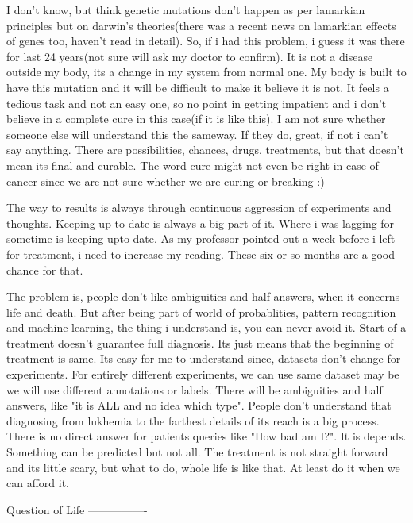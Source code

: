I don't know, but think genetic mutations don't happen as per lamarkian principles but on darwin's theories(there was a recent news on lamarkian effects of genes too, haven't read in detail). So, if i had this problem, i guess it was there for last 24 years(not sure will ask my doctor to confirm). It is not a disease outside my body, its a change in my system from normal one. My body is built to have this mutation and it will be difficult to make it believe it is not. It feels a tedious task and not an easy one, so no point in getting impatient and i don't believe in a complete cure in this case(if it is like this). I am not sure whether someone else will understand this the sameway. If they do, great, if not i can't say anything. There are possibilities, chances, drugs, treatments, but that doesn't mean its final and curable. The word cure might not even be right in case of cancer since we are not sure whether we are curing or breaking :)

The way to results is always through continuous aggression of experiments and thoughts. Keeping up to date is always a big part of it. Where i was lagging for sometime is keeping upto date. As my professor pointed out a week before i left for treatment, i need to increase my reading. These six or so months are a good chance for that. 

The problem is, people don't like ambiguities and half answers, when it concerns life and death. But after being part of world of probablities, pattern recognition and machine learning, the thing i understand is, you can never avoid it. Start of a treatment doesn't guarantee full diagnosis. Its just means that the beginning of treatment is same. Its easy for me to understand since, datasets don't change for experiments. For entirely different experiments, we can use same dataset may be we will use different annotations or labels. There will be ambiguities and half answers, like "it is ALL and no idea which type". People don't understand that diagnosing from lukhemia to the farthest details of its reach is a big process. There is no direct answer for patients queries like "How bad am I?". It is depends. Something can be predicted but not all. The treatment is not straight forward and its little scary, but what to do, whole life is like that. At least do it when we can afford it. 

Question of Life
----------------

